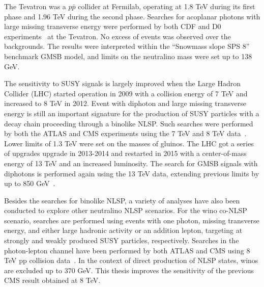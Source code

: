 \documentclass[thesis.tex]{subfiles}
\begin{document}
The Tevatron was a $p\bar{p}$ collider at Fermilab, operating at 1.8 TeV during its first phase and 1.96 TeV during the second phase.
Searches for acoplanar photons with large missing transverse energy were performed by both CDF and D0 experiments~\cite{CDFdiphoton,D0diphoton} at the Tevatron.
No excess of events was observed over the backgrounds.
The results were interpreted within the ``Snowmass slope SPS 8'' benchmark GMSB model, and limits on the neutralino mass were set up to 138 GeV. 

The sensitivity to SUSY signals is largely improved when the Large Hadron Collider (LHC) started operation in 2009 with a collision energy of 7 TeV and increased to 8 TeV in 2012.
Event with diphoton and large missing transverse energy is still an important signature for the production of SUSY particles with a decay chain proceeding through a binolike NLSP. 
Such searches were performed by both the ATLAS and CMS experiments using the 7 TeV and 8 TeV data~\cite{ATLASdiphoton7TeV, CMSdiphoton7TeV, CMSdiphoton8TeV,ATLASdiphoton8TeV}.
Lower limits of 1.3 TeV were set on the masses of gluinos.
The LHC got a series of upgrades upgrade in 2013-2014 and restarted in 2015 with a center-of-mass energy of 13 TeV and an increased luminosity.
The search for GMSB signals with diphotons is performed again using the 13 TeV data, extending previous limits by up to 850 GeV~\cite{ATLASdiphoton13TeV}.   

Besides the searches for binolike NLSP, a variety of analyses have also been conducted to explore other neutralino NLSP scenarios. 
For the wino co-NLSP scenario, searches are performed using events with one photon, missing transverse energy, and either large hadronic activity or an addition lepton, targeting at strongly and weakly produced SUSY particles, respectively.
Searches in the photon-lepton channel have been performed by both ATLAS and CMS using 8 TeV pp collision data~\cite{Yutaro}.
In the context of direct production of NLSP states, winos are excluded up to 370 GeV.
This thesis improves the sensitivity of the previous CMS result obtained at 8 TeV.
\end{document}
